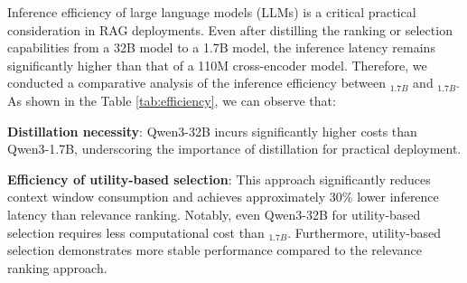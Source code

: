 Inference efficiency of large language models (LLMs) is a critical practical consideration in RAG deployments. 
Even after distilling the ranking or selection capabilities from a 32B model to a 1.7B model, the inference latency remains significantly higher than that of a 110M cross-encoder model. 
Therefore, we conducted a comparative analysis of the inference efficiency between \rank$_{1.7B}$ and \utility$_{1.7B}$. 
As shown in the Table \ref{tab:efficiency}, we can observe that: 
\begin{enumerate*}
    \item \textbf{Distillation necessity}: Qwen3-32B incurs significantly higher costs than Qwen3-1.7B, underscoring the importance of distillation for practical deployment.  
    \item  \textbf{Efficiency of utility-based selection}: 
    This approach significantly reduces context window consumption and achieves approximately 30\% lower inference latency than relevance ranking.
    Notably, even Qwen3-32B for utility-based selection requires less computational cost than \rank$_{1.7B}$. 
    Furthermore, utility-based selection demonstrates more stable performance compared to the relevance ranking approach. 
\end{enumerate*}


